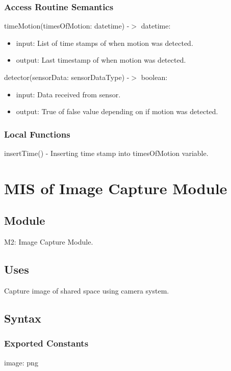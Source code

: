 \documentclass[12pt, titlepage]{article}
\begin{document}
\subsubsection{Access Routine Semantics}

\noindent timeMotion(timesOfMotion: datetime) -$>$ datetime:
\begin{itemize}
\item input: List of time stamps of when motion was detected. 
\item output: Last timestamp of when motion was detected. 
\end{itemize}

\noindent detector(sensorData: sensorDataType) -$>$ boolean:
\begin{itemize}
\item input: Data received from sensor. 
\item output: True of false value depending on if motion was detected. 
\end{itemize}

\subsubsection{Local Functions}

insertTime() - Inserting time stamp into timesOfMotion variable.


\newpage


\section{MIS of Image Capture Module} \label{Module} 

\subsection{Module}

M2: Image Capture Module.

\subsection{Uses}
Capture image of shared space using camera system.

\subsection{Syntax}

\subsubsection{Exported Constants}
image: png
\end{document}
